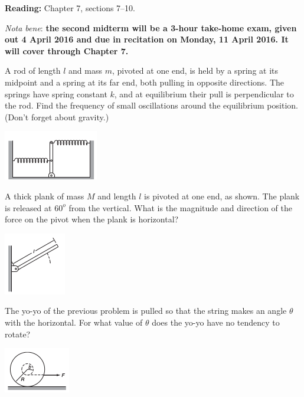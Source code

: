 \documentclass[12pt,letterpaper]{hmcpset}
\newcommand{\dg}[1]{\ensuremath{#1^o}}
\begin{document}



\noindent
\textbf{Reading:} Chapter 7, sections 7--10. \par
\noindent
\emph{Nota bene}: \textbf{the second midterm will
be a 3-hour take-home exam, given out 4 April 2016
and due in recitation on Monday, 11 April 2016. 
It will cover through Chapter 7.}

\begin{problem}
A rod of length $l$ and mass $m$, pivoted at one end, is held by a spring at
its midpoint and a spring at its far end, both pulling in opposite
directions. The springs have spring constant $k$, and at equilibrium their
pull is perpendicular to the rod. Find the frequency of small oscillations
around the equilibrium position. (Don't forget about gravity.)
\begin{center}
    \includegraphics{img/7_17}
\end{center}
\end{problem}
\clearpage

\begin{problem}
A thick plank of mass $M$ and length $l$ is pivoted at one end, as shown. The
plank is released at $\dg{60}$ from the vertical. What is the magnitude and
direction of the force on the pivot when the plank is horizontal?
\begin{center}
    \includegraphics{img/7_20}
\end{center}
\end{problem}
\clearpage

\begin{problem}
The yo-yo of the previous problem is pulled so that the string makes an angle
$\theta$ with the horizontal. For what value of $\theta$ does the yo-yo have
no tendency to rotate?
\begin{center}
    \includegraphics{img/7_28}
\end{center}
\end{problem}
\clearpage
\end{document}
